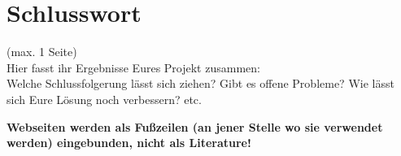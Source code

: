 \documentclass[paper=A4, deutsch]{scrartcl}
\begin{document}
\section{Schlusswort}
(max. 1 Seite)\\
Hier fasst ihr Ergebnisse Eures Projekt zusammen:\\
Welche Schlussfolgerung lässt sich ziehen? Gibt es offene Probleme? Wie lässt sich Eure Lösung noch verbessern? etc.



\textbf{Webseiten werden als Fußzeilen (an jener Stelle wo sie verwendet werden) eingebunden, nicht als Literature!}
\end{document}
